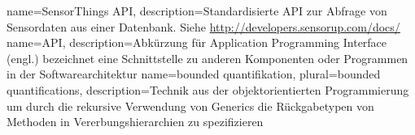 \makenoidxglossaries
{}
{
	name=SensorThings \gls{API},
	description={Standardisierte \gls{API} zur Abfrage von Sensordaten aus einer Datenbank. Siehe \url{http://developers.sensorup.com/docs/}}
}
{
	name=API,
	description={Abkürzung für Application Programming Interface (engl.) bezeichnet eine Schnittstelle zu anderen Komponenten oder Programmen in der Softwarearchitektur}
}
{
    name=bounded quantifikation,
    plural=bounded quantifications,
    description={Technik aus der objektorientierten Programmierung um durch die rekursive Verwendung von Generics die Rückgabetypen von Methoden in Vererbungshierarchien zu spezifizieren}
}